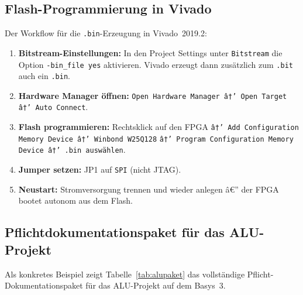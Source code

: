 ﻿\documentclass[a4paper,12pt]{article}
\theoremstyle{definition}
\begin{document}
\subsection{Flash-Programmierung in Vivado}

Der Workflow für die \texttt{.bin}-Erzeugung in Vivado~2019.2:

\begin{enumerate}
    \item \textbf{Bitstream-Einstellungen:} In den Project Settings unter
          \texttt{Bitstream} die Option \texttt{-bin\_file yes} aktivieren.
          Vivado erzeugt dann zusätzlich zum \texttt{.bit} auch ein \texttt{.bin}.
    \item \textbf{Hardware Manager öffnen:} \texttt{Open Hardware Manager
          â†’ Open Target â†’ Auto Connect}.
    \item \textbf{Flash programmieren:} Rechtsklick auf den FPGA
          \texttt{â†’ Add Configuration Memory Device â†’ Winbond W25Q128}
          \texttt{â†’ Program Configuration Memory Device â†’ .bin auswählen}.
    \item \textbf{Jumper setzen:} JP1 auf \texttt{SPI} (nicht JTAG).
    \item \textbf{Neustart:} Stromversorgung trennen und wieder anlegen â€”
          der FPGA bootet autonom aus dem Flash.
\end{enumerate}

\subsection{Pflichtdokumentationspaket für das ALU-Projekt}

Als konkretes Beispiel zeigt Tabelle~\ref{tab:alupaket} das vollständige
Pflicht-Dokumentationspaket für das ALU-Projekt auf dem Basys~3.
\end{document}
